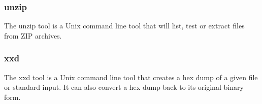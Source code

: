 \subsubsection{unzip}
The unzip tool \cite{unzip} is a Unix command line tool that will list, test or extract files from ZIP archives.
\subsubsection{xxd}
The xxd tool \cite{xxd} is a Unix command line tool that creates a hex dump of a given file or standard input. It can also convert a hex dump back to its original binary form.